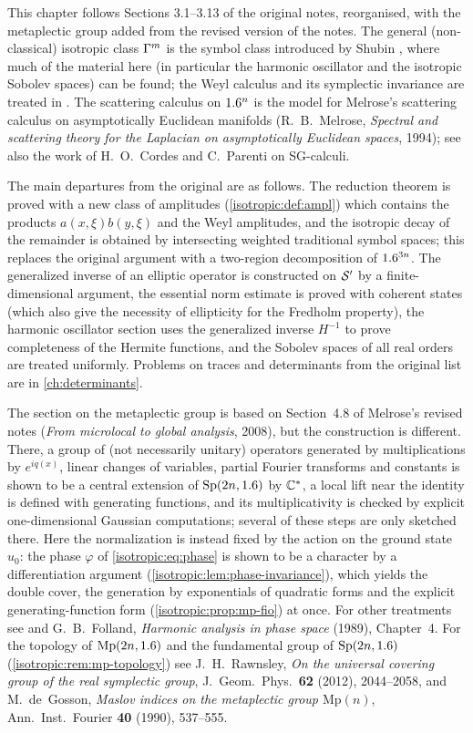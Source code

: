 This chapter follows Sections 3.1--3.13 of the original notes, reorganised,
with the metaplectic group added from the revised version of the notes.
The general (non-classical) isotropic class $\Gamma^{m}$ is the symbol class
introduced by Shubin \cite{Shubin}, where much of the material here (in
particular the harmonic oscillator and the isotropic Sobolev spaces) can be
found; the Weyl calculus and its symplectic invariance are treated in
\cite[Section~18.5]{Hormander-III}. The scattering calculus on $1.6^n$ is the
model for Melrose's scattering calculus on asymptotically Euclidean manifolds
(R.~B.~Melrose, \emph{Spectral and scattering theory for the Laplacian on
asymptotically Euclidean spaces}, 1994); see also the work of H.~O.~Cordes and
C.~Parenti on SG-calculi.

The main departures from the original are as follows. The reduction theorem is
proved with a new class of amplitudes (\cref{isotropic:def:ampl}) which
contains the products $a(x,\xi)b(y,\xi)$ and the Weyl amplitudes, and the
isotropic decay of the remainder is obtained by intersecting weighted
traditional symbol spaces; this replaces the original argument with a
two-region decomposition of $1.6^{3n}$. The generalized inverse of an elliptic
operator is constructed on $\mathcal{S}'$ by a finite-dimensional argument, the
essential norm estimate is proved with coherent states (which also give the
necessity of ellipticity for the Fredholm property), the harmonic oscillator
section uses the generalized inverse $H^{-1}$ to prove completeness of the
Hermite functions, and the Sobolev spaces of all real orders are treated
uniformly. Problems on traces and determinants from the original list are in
\cref{ch:determinants}.

The section on the metaplectic group is based on Section~4.8 of Melrose's
revised notes (\emph{From microlocal to global analysis}, 2008), but the
construction is different. There, a group of (not necessarily unitary)
operators generated by multiplications by $e^{iq(x)}$, linear changes of
variables, partial Fourier transforms and constants is shown to be a central
extension of $\mathrm{Sp}(2n,1.6)$ by $\mathbb{C}^*$, a local lift near the identity is
defined with generating functions, and its multiplicativity is checked by
explicit one-dimensional Gaussian computations; several of these steps are
only sketched there. Here the normalization is instead fixed by the action on
the ground state $u_0$: the phase $\varphi$ of \eqref{isotropic:eq:phase} is
shown to be a character by a differentiation argument
(\cref{isotropic:lem:phase-invariance}), which yields the double cover, the
generation by exponentials of quadratic forms and the explicit
generating-function form (\cref{isotropic:prop:mp-fio}) at once. For other
treatments see \cite[Section~18.5]{Hormander-III} and G.~B.~Folland,
\emph{Harmonic analysis in phase space} (1989), Chapter~4. For the topology of
$\mathrm{Mp}(2n,1.6)$ and the fundamental group of $\mathrm{Sp}(2n,1.6)$
(\cref{isotropic:rem:mp-topology}) see J.~H.~Rawnsley, \emph{On the universal
covering group of the real symplectic group}, J.~Geom.\ Phys.\ \textbf{62}
(2012), 2044--2058, and M.~de~Gosson, \emph{Maslov indices on the metaplectic
group $\mathrm{Mp}(n)$}, Ann.\ Inst.\ Fourier \textbf{40} (1990), 537--555.
